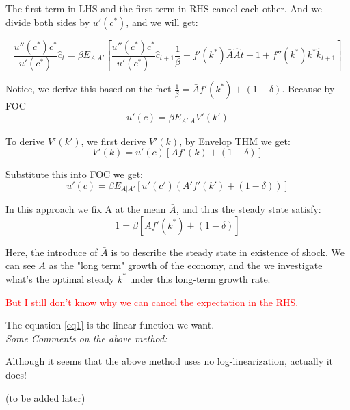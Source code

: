\documentclass{book}
\theoremstyle{plain}
\theoremstyle{definition}
\begin{document}
The first term in LHS and the first term in RHS cancel each other.
And we divide both sides by $u'(c^*)$, and we will get:

\begin{equation}\label{eq1}
\frac{u''(c^*)c^*}{u'(c^*)}\hat c_t
=\beta E_{A|A'}[\frac{u''(c^*)c^*}{u'(c^*)}\hat c_{t+1} \frac{1}{\beta}
+f'(k^*)\bar A \hat A{t+1}
+f''(k^*)k^*\hat k_{t+1}]
\end{equation}

Notice, we derive this based on the fact $\frac{1}{\beta}=\bar A f'(k^*)+(1-\delta)$.
Because by FOC
\[u'(c)=\beta E_{A'|A}V'(k')\]

To derive $V'(k')$, we first derive $V'(k)$,
by Envelop THM we get:
\[V'(k)=u'(c)[Af'(k)+(1-\delta)]\]

Substitute this into FOC we get:
\[u'(c)=\beta E_{A|A'}[u'(c')(A'f'(k')+(1-\delta))]\]

In this approach we fix A at the mean $\bar A$,
and thus the steady state satisfy:
\[1=\beta [\bar Af'(k^*)+(1-\delta)]\]

Here, the introduce of $\bar A$ is to describe the steady state in existence of shock.
We can see $\bar A$ as the "long term" growth of the economy,
and the we investigate what's the optimal steady $k^*$ under this long-term growth rate.

\textcolor{red}
{But I still don't know why we can cancel the expectation in the RHS.}

The equation \ref{eq1} is the linear function we want.\\

\noindent
\emph{Some Comments on the above method:}

Although it seems that the above method uses no log-linearization,
actually it does!

(to be added later)





\renewcommand\refname{Reference}


\end{document}
